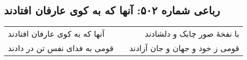 \begin{center}
\section*{رباعی شماره ۵۰۲: آنها که به کوی عارفان افتادند}
\label{sec:0502}
\begin{longtable}{l p{0.5cm} r}
آنها که به کوی عارفان افتادند
&&
با نفخهٔ صور چابک و دلشادند
\\
قومی به فدای نفس تن در دادند
&&
قومی ز خود و جهان و جان آزادند
\\
\end{longtable}
\end{center}
